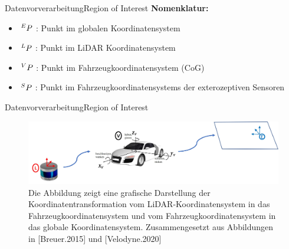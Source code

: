 \documentclass[169, handout	]{THIbeamer} %
\begin{document}
	\begin{frame}{Datenvorverarbeitung}{Region of Interest}
		\textbf{Nomenklatur:} 
		\begin{itemize}
			\item $\hspace*{0.2em}^E\vspace*{-0.2em}P$ : Punkt im globalen Koordinatensystem
			\item $\hspace*{0.2em}^L\vspace*{-0.2em}P$ : Punkt im LiDAR Koordinatensystem
			\item $\hspace*{0.2em}^V\vspace*{-0.2em}P$ : Punkt im Fahrzeugkoordinatensystem (CoG)
			\item $\hspace*{0.2em}^{S}\vspace*{-0.2em}P$ : Punkt im Fahrzeugkoordinatensystems der exterozeptiven Sensoren
		\end{itemize}
	\end{frame}
	\begin{frame}{Datenvorverarbeitung}{Region of Interest}
		\begin{figure}
			\includegraphics[scale=0.5]{required/Szenarioanwendung Koordinatentransformation.jpg}
			\caption{Die Abbildung zeigt eine grafische Darstellung der Koordinatentransformation vom LiDAR-Koordinatensystem in das Fahrzeugkoordinatensystem und vom Fahrzeugkoordinatensystem in das globale Koordinatensystem. Zusammengesetzt aus Abbildungen in [Breuer.2015] und [Velodyne.2020]}
        	\label{Globales Koordinatensystem}
       	\end{figure}
       	\footnotesize
	\end{frame}
\end{document}
